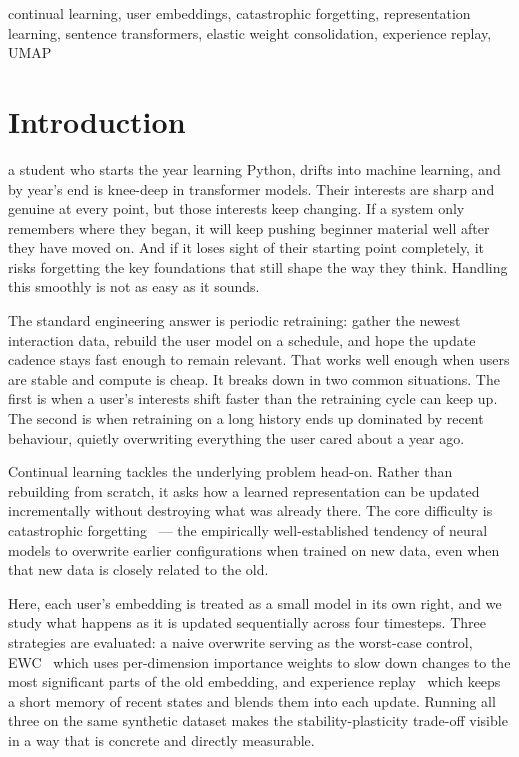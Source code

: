 \documentclass[conference]{IEEEtran}
\begin{document}
\begin{IEEEkeywords}
continual learning,
user embeddings,
catastrophic forgetting,
representation learning,
sentence transformers,
elastic weight consolidation,
experience replay,
UMAP
\end{IEEEkeywords}

\section{Introduction}

 a student who starts the year
learning Python, drifts into machine learning, and by
year's end is knee-deep in transformer models. Their
interests are sharp and genuine at every point, but those
interests keep changing. If a system only remembers where
they began, it will keep pushing beginner material well
after they have moved on. And if it loses sight of their
starting point completely, it risks forgetting the key
foundations that still shape the way they think. Handling
this smoothly is not as easy as it sounds.

The standard engineering answer is periodic retraining:
gather the newest interaction data, rebuild the user model
on a schedule, and hope the update cadence stays fast
enough to remain relevant. That works well enough when
users are stable and compute is cheap. It breaks down in
two common situations. The first is when a user's interests
shift faster than the retraining cycle can keep up. The
second is when retraining on a long history ends up
dominated by recent behaviour, quietly overwriting
everything the user cared about a year ago.

Continual learning tackles the underlying problem head-on.
Rather than rebuilding from scratch, it asks how a learned
representation can be updated incrementally without
destroying what was already there. The core difficulty is
catastrophic forgetting~\cite{mccloskey1989} --- the
empirically well-established tendency of neural models to
overwrite earlier configurations when trained on new data,
even when that new data is closely related to the old.

Here, each user's embedding is treated as a small model in
its own right, and we study what happens as it is updated
sequentially across four timesteps. Three strategies are
evaluated: a naive overwrite serving as the worst-case
control, EWC~\cite{kirkpatrick2017} which uses per-dimension
importance weights to slow down changes to the most
significant parts of the old embedding, and experience
replay~\cite{rolnick2019} which keeps a short memory of
recent states and blends them into each update. Running all
three on the same synthetic dataset makes the
stability-plasticity trade-off visible in a way that is
concrete and directly measurable.
\end{document}
